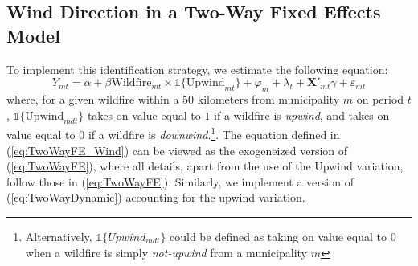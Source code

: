 \documentclass[11pt]{article}
\begin{document}
\begin{spacing}{1.3}



\subsection{Wind Direction in a Two-Way Fixed Effects Model}
\label{sscn:wind}




To implement this identification strategy, we estimate the following equation:
\begin{equation}
\label{eq:TwoWayFE_Wind}
Y_{mt}=\alpha + \beta\text{Wildfire}_{mt}\times\mathds{1}\{\text{Upwind}_{mt}\} + \varphi_{m} + \lambda_t + \bm{X}'_{mt}\gamma + \varepsilon_{mt}
\end{equation}
where, for a given wildfire within a 50 kilometers from municipality $m$ on period $t$, $\mathds{1}\{\text{Upwind}_{mdt}\}$ takes on value equal to $1$ if a wildfire is \textit{upwind}, and takes on value equal to $0$ if a wildfire is \textit{downwind}.\footnote{Alternatively,  $\mathds{1}\{Upwind_{mdt}\}$ could be defined as taking on value equal to $0$ when a wildfire is simply \textit{not-upwind} from a municipality $m$}.  The equation defined in (\ref{eq:TwoWayFE_Wind}) can be viewed as the exogeneized version of (\ref{eq:TwoWayFE}), where all details, apart from the use of the Upwind variation, follow those in (\ref{eq:TwoWayFE}). Similarly, we implement a version of (\ref{eq:TwoWayDynamic}) accounting for the upwind variation.




\end{spacing}
\end{document}
